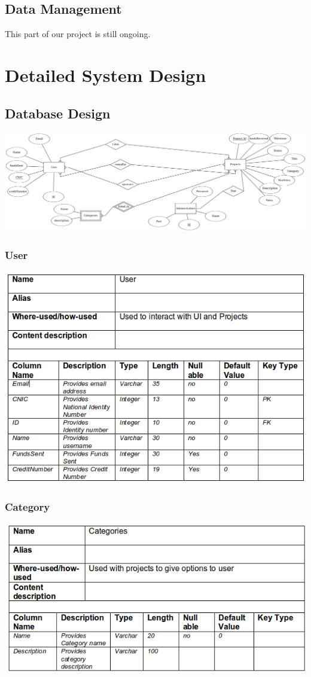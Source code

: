 \documentclass{scrreprt}
\begin{document}
\subsection{Data Management}
This part of our project is still ongoing.

\section{Detailed System Design}
\subsection{Database Design}
\includegraphics[width=\textwidth]{erd.png}

\subsubsection{User}
\includegraphics[width=\textwidth]{user.png}

\subsubsection{Category}
\includegraphics[width=\textwidth]{cat.png}
\end{document}
